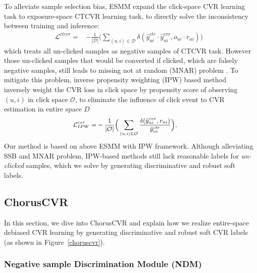 To alleviate sample selection bias,  ESMM \cite{essm} expand the click-space CVR learning task to exposure-space CTCVR learning task, to directly solve the inconsistency between training and inference:
\begin{equation}
\begin{split}
\mathcal{L}^{ctcvr} = &- \frac{1}{|\mathcal{D}|}\Big(\sum_{(u,i)\in\mathcal{D}}\delta(\hat{y}^{ctr}_{ui}\cdot\hat{y}^{cvr}_{ui}, o_{ui}\cdot r_{ui})\Big)
\end{split}
\label{ctxcvr}
\end{equation}
which treats all un-clicked samples as negative samples of CTCVR task. However those un-clicked samples that would be converted if clicked, which are falsely negative samples,  still leads to missing not at random (MNAR) problem  \cite{multiipw}. To mitigate this problem, inverse propensity weighting (IPW) \cite{multiipw,escm2} based method inversely weight the CVR loss in click space by propensity score of observing  $(u,i)$ in click space $\mathcal{O}$, to eliminate the influence of click event to CVR estimation in entire space $D$
\begin{equation}
\small
\begin{split}
\mathcal{L}^{cvr}_{IPW} =& - \frac{1}{|\mathcal{O}|}\Big(\sum_{(u,i)\in\mathcal{O}}\frac{\delta(\hat{y}^{cvr}_{ui}, r_{ui})}{\hat{y}^{ctr}_{ui}}\Big),
\end{split}
\label{cvripw}
\end{equation}
% 
%
Our method is based on above ESMM with IPW  framework. Although alleviating SSB and MNAR problem, IPW-based methods still lack reasonable labels for \textit{un-clicked} samples, which we solve by generating discriminative and robust soft labels.






\subsection{ChorusCVR}
In this section, we dive into ChorusCVR and explain how we realize entire-space debiased CVR learning by generating discriminative and robust soft CVR labels (as shown in Figure~\ref{choruscvr}).

\subsubsection{Negative sample Discrimination Module (NDM)}


